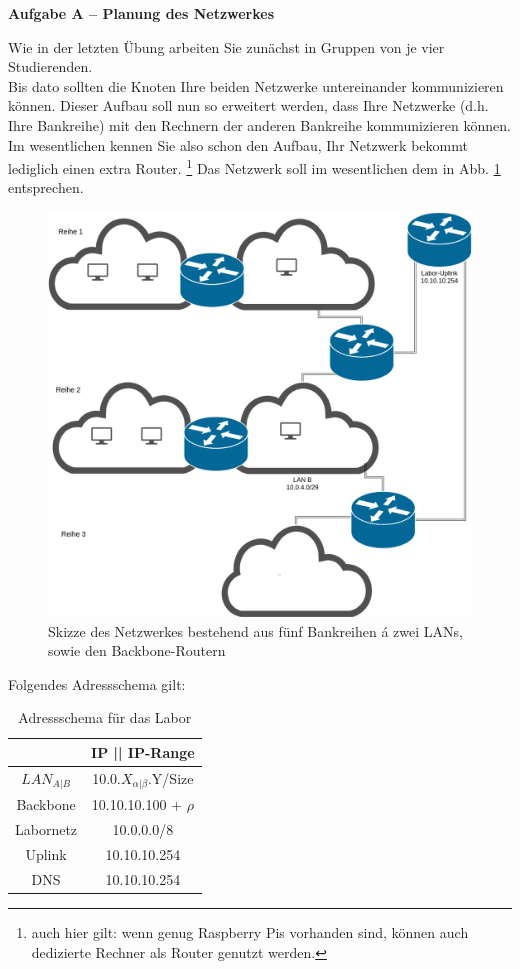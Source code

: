 \documentclass[paper=a4,fontsize=11pt]{scrartcl}%
\numberwithin{equation}{section}
\begin{document}
\begin{center}\Large{\textbf{Aufgabe A -- Planung des Netzwerkes}}\end{center}\vskip0.25in
Wie in der letzten Übung arbeiten Sie zunächst in Gruppen von je vier Studierenden.\\
Bis dato sollten die Knoten Ihre beiden Netzwerke untereinander kommunizieren können. Dieser Aufbau soll nun so erweitert werden, dass Ihre Netzwerke (d.h. Ihre Bankreihe) mit den Rechnern der anderen Bankreihe kommunizieren können. Im wesentlichen kennen Sie also schon den Aufbau, Ihr Netzwerk bekommt lediglich einen extra Router. \footnote{auch hier gilt: wenn genug Raspberry Pis vorhanden sind, können auch dedizierte Rechner als Router genutzt werden.} Das Netzwerk soll im wesentlichen dem in Abb. \ref{backbone} entsprechen.
	\begin{figure}[H]
	\centering
	\includegraphics[scale=0.35]{backbone}
	\caption{Skizze des Netzwerkes bestehend aus fünf Bankreihen á zwei LANs, sowie den Backbone-Routern}
	\label{backbone}
	\end{figure}
Folgendes Adressschema gilt:
\begin{table}[H]
\caption{Adressschema für das Labor}
\label{adress_scheme}
\centering
\begin{tabular}{|c|c|}\hline
 & \textbf{IP  || IP-Range} \\ \hline
 $LAN_{A|B}$ & 10.0.$X_{\alpha|\beta}$.Y/Size \\ \hline
 Backbone & 10.10.10.100 + $\rho$ \\ \hline
 Labornetz & 10.0.0.0/8 \\ \hline
 Uplink & 10.10.10.254 \\ \hline
 DNS & 10.10.10.254 \\ \hline
\end{tabular}
\end{table} 
\end{document}
